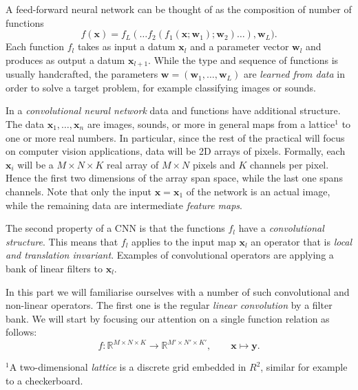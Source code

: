 \documentclass[11pt]{article}
\begin{document}
A feed-forward neural network can be thought of as the composition of
number of functions \[
f(\mathbf{x}) = f_L(\dots f_2(f_1(\mathbf{x};\mathbf{w}_1);\mathbf{w}_2)\dots),\mathbf{w}_{L}).
\] Each function \(f_l\) takes as input a datum \(\mathbf{x}_l\) and a
parameter vector \(\mathbf{w}_l\) and produces as output a datum
\(\mathbf{x}_{l+1}\). While the type and sequence of functions is
usually handcrafted, the parameters
\(\mathbf{w}=(\mathbf{w}_1,\dots,\mathbf{w}_L)\) are \emph{learned from
data} in order to solve a target problem, for example classifying images
or sounds.

In a \emph{convolutional neural network} data and functions have
additional structure. The data \(\mathbf{x}_1,\dots,\mathbf{x}_n\) are
images, sounds, or more in general maps from a lattice\(^1\) to one or
more real numbers. In particular, since the rest of the practical will
focus on computer vision applications, data will be 2D arrays of pixels.
Formally, each \(\mathbf{x}_i\) will be a \(M \times N \times K\) real
array of \(M \times N\) pixels and \(K\) channels per pixel. Hence the
first two dimensions of the array span space, while the last one spans
channels. Note that only the input \(\mathbf{x}=\mathbf{x}_1\) of the
network is an actual image, while the remaining data are intermediate
\emph{feature maps}.

The second property of a CNN is that the functions \(f_l\) have a
\emph{convolutional structure}. This means that \(f_l\) applies to the
input map \(\mathbf{x}_l\) an operator that is \emph{local and
translation invariant}. Examples of convolutional operators are applying
a bank of linear filters to \(\mathbf{x}_l\).

In this part we will familiarise ourselves with a number of such
convolutional and non-linear operators. The first one is the regular
\emph{linear convolution} by a filter bank. We will start by focusing
our attention on a single function relation as follows: \[
 f: \mathbb{R}^{M\times N\times K} \rightarrow \mathbb{R}^{M' \times N' \times K'},
 \qquad \mathbf{x} \mapsto \mathbf{y}.
\]

\(^1\)A two-dimensional \emph{lattice} is a discrete grid embedded in
\(R^2\), similar for example to a checkerboard.
\end{document}
